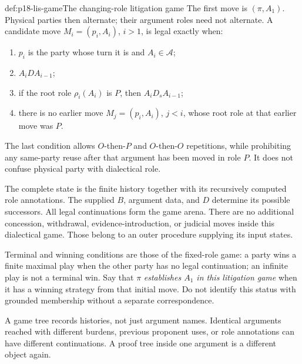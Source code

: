 \begin{hbdefinition}{def:p18-lis-game}{The changing-role litigation game}
The first move is \((\pi,A_1)\). Physical parties then alternate;
their argument roles need not alternate.
A candidate move \(M_i=(p_i,A_i)\), \(i>1\), is legal exactly when:
\begin{enumerate}
\item \(p_i\) is the party whose turn it is and \(A_i\in\mathcal A\);
\item \(A_iDA_{i-1}\);
\item if the root role \(\rho_i(A_i)\) is \(P\), then
\(A_iD_sA_{i-1}\);
\item there is no earlier move \(M_j=(p_i,A_i)\), \(j<i\),
whose root role at that earlier move was \(P\).
\end{enumerate}
The last condition allows \(O\)-then-\(P\) and \(O\)-then-\(O\)
repetitions, while prohibiting any same-party reuse after that
argument has been moved in role \(P\).
It does not confuse physical party with dialectical role.

The complete state is the finite history together with its recursively
computed role annotations. The supplied \(B\), argument data,
and \(D\) determine its possible successors.
All legal continuations form the game arena.
There are no additional concession, withdrawal, evidence-introduction,
or judicial moves inside this dialectical game.
Those belong to an outer procedure supplying its input states.

Terminal and winning conditions are those of the fixed-role game:
a party wins a finite maximal play when the other party has no legal
continuation; an infinite play is not a terminal win.
Say that \(\pi\) \emph{establishes \(A_1\) in this litigation game}
when it has a winning strategy from that initial move.
Do not identify this status with grounded membership without a
separate correspondence.
\end{hbdefinition}

A game tree records histories, not just argument names.
Identical arguments reached with different burdens, previous
proponent uses, or role annotations can have different continuations.
A proof tree inside one argument is a different object again.

